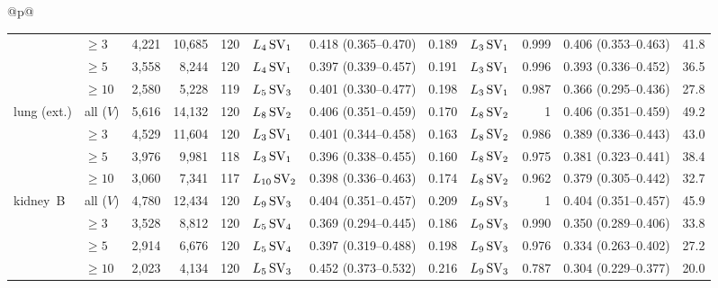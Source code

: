 \begin{longtable}{@{}p{\textwidth}@{}}
{\begin{tabular*}{\textwidth}{@{\extracolsep{\fill}}llrrrlcrlrcr@{}}
 & $\geq 3$ & 4,221 & 10,685 & 120 & $L_{4}\,\mathrm{SV}_{1}$ & 0.418 (0.365--0.470) & 0.189 & $L_{3}\,\mathrm{SV}_{1}$ & 0.999 & 0.406 (0.353--0.463) & 41.8 \\
 & $\geq 5$ & 3,558 & 8,244 & 120 & $L_{4}\,\mathrm{SV}_{1}$ & 0.397 (0.339--0.457) & 0.191 & $L_{3}\,\mathrm{SV}_{1}$ & 0.996 & 0.393 (0.336--0.452) & 36.5 \\
 & $\geq 10$ & 2,580 & 5,228 & 119 & $L_{5}\,\mathrm{SV}_{3}$ & 0.401 (0.330--0.477) & 0.198 & $L_{3}\,\mathrm{SV}_{1}$ & 0.987 & 0.366 (0.295--0.436) & 27.8 \\
\addlinespace[2pt]
lung (ext.) & all ($V$) & 5,616 & 14,132 & 120 & $L_{8}\,\mathrm{SV}_{2}$ & 0.406 (0.351--0.459) & 0.170 & $L_{8}\,\mathrm{SV}_{2}$ & 1 & 0.406 (0.351--0.459) & 49.2 \\
 & $\geq 3$ & 4,529 & 11,604 & 120 & $L_{3}\,\mathrm{SV}_{1}$ & 0.401 (0.344--0.458) & 0.163 & $L_{8}\,\mathrm{SV}_{2}$ & 0.986 & 0.389 (0.336--0.443) & 43.0 \\
 & $\geq 5$ & 3,976 & 9,981 & 118 & $L_{3}\,\mathrm{SV}_{1}$ & 0.396 (0.338--0.455) & 0.160 & $L_{8}\,\mathrm{SV}_{2}$ & 0.975 & 0.381 (0.323--0.441) & 38.4 \\
 & $\geq 10$ & 3,060 & 7,341 & 117 & $L_{10}\,\mathrm{SV}_{2}$ & 0.398 (0.336--0.463) & 0.174 & $L_{8}\,\mathrm{SV}_{2}$ & 0.962 & 0.379 (0.305--0.442) & 32.7 \\
\addlinespace[2pt]
kidney~B & all ($V$) & 4,780 & 12,434 & 120 & $L_{9}\,\mathrm{SV}_{3}$ & 0.404 (0.351--0.457) & 0.209 & $L_{9}\,\mathrm{SV}_{3}$ & 1 & 0.404 (0.351--0.457) & 45.9 \\
 & $\geq 3$ & 3,528 & 8,812 & 120 & $L_{5}\,\mathrm{SV}_{4}$ & 0.369 (0.294--0.445) & 0.186 & $L_{9}\,\mathrm{SV}_{3}$ & 0.990 & 0.350 (0.289--0.406) & 33.8 \\
 & $\geq 5$ & 2,914 & 6,676 & 120 & $L_{5}\,\mathrm{SV}_{4}$ & 0.397 (0.319--0.488) & 0.198 & $L_{9}\,\mathrm{SV}_{3}$ & 0.976 & 0.334 (0.263--0.402) & 27.2 \\
 & $\geq 10$ & 2,023 & 4,134 & 120 & $L_{5}\,\mathrm{SV}_{3}$ & 0.452 (0.373--0.532) & 0.216 & $L_{9}\,\mathrm{SV}_{3}$ & 0.787 & 0.304 (0.229--0.377) & 20.0 \\
\end{tabular*}}\\
\end{longtable}
\endgroup
